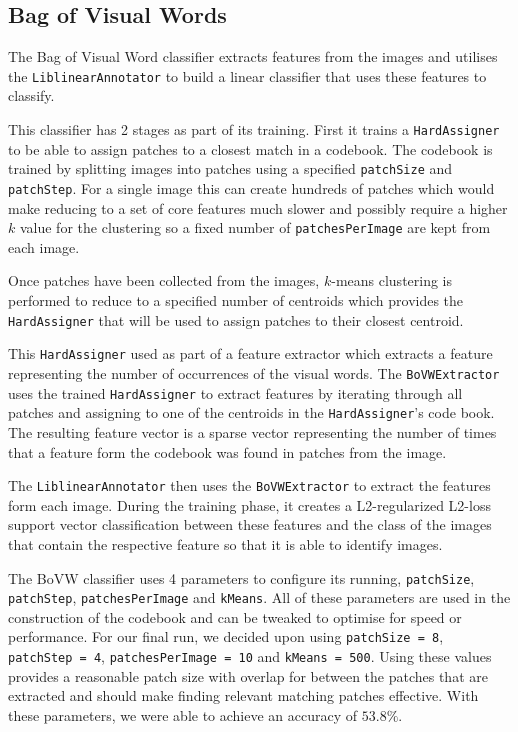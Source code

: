 \documentclass[paper=a4]{article}
\begin{document}
\subsection{Bag of Visual Words}

The Bag of Visual Word classifier extracts features from the images and utilises the \texttt{LiblinearAnnotator} to build a linear classifier that uses these features to classify.

This classifier has 2 stages as part of its training. First it trains a \texttt{HardAssigner} to be able to assign patches to a closest match in a codebook. The codebook is trained by splitting images into patches using a specified  \texttt{patchSize} and \texttt{patchStep}. For a single image this can create hundreds of patches which would make reducing to a set of core features much slower and possibly require a higher $k$ value for the clustering so a fixed number of \texttt{patchesPerImage} are kept from each image. 

Once patches have been collected from the images, $k$-means clustering is performed to reduce to a specified number of centroids which provides the \texttt{HardAssigner} that will be used to assign patches to their closest centroid.

This \texttt{HardAssigner} used as part of a feature extractor which extracts a feature representing the number of occurrences of the visual words. The \texttt{BoVWExtractor} uses the trained \texttt{HardAssigner} to extract features by iterating through all patches and assigning to one of the centroids in the \texttt{HardAssigner}'s code book. The resulting feature vector is a sparse vector representing the number of times that a feature form the codebook was found in patches from the image.

The \texttt{LiblinearAnnotator} then uses the \texttt{BoVWExtractor} to extract the features form each image. During the training phase, it creates a L2-regularized L2-loss support vector classification between these features and the class of the images that contain the respective feature so that it is able to identify images.

The BoVW classifier uses 4 parameters to configure its running, \texttt{patchSize}, \texttt{patchStep}, \texttt{patchesPerImage} and \texttt{kMeans}. All of these parameters are used in the construction of the codebook and can be tweaked to optimise for speed or performance. For our final run, we decided upon using \texttt{patchSize = 8}, \texttt{patchStep = 4}, \texttt{patchesPerImage = 10} and \texttt{kMeans = 500}. Using these values provides a reasonable patch size with overlap for between the patches that are extracted and should make finding relevant matching patches effective. With these parameters, we were able to achieve an accuracy of $53.8\%$. %
\end{document}
